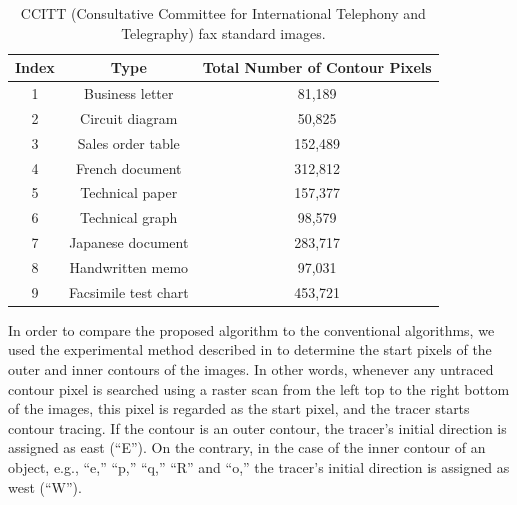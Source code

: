 \documentclass[sensors,article,accept,moreauthors,pdftex,10pt,a4paper]{mdpi}
\begin{document}
\begin{table}[H]
	\centering
	\begin{tabular}{ccc}
		\toprule
		\textbf{Index} & \textbf{Type} & \textbf{Total Number of Contour Pixels} \\
		\midrule
		1 & Business letter & 81,189 \\
		2 & Circuit diagram & 50,825 \\
		3 & Sales order table & 152,489 \\
		4 & French document & 312,812 \\
		5 & Technical paper & 157,377 \\
		6 & Technical graph & 98,579 \\
		7 & Japanese document & 283,717 \\
		8 & Handwritten memo & 97,031 \\
		9 & Facsimile test chart & 453,721 \\
		\bottomrule
	\end{tabular}
	\caption{\protect CCITT (Consultative Committee for International Telephony and Telegraphy) fax standard images.}
	\label{table:ccitt}
\end{table}	


In order to compare the proposed algorithm to the conventional algorithms, we used the experimental method described in \cite{Danielsson1981Improvement} to determine the start pixels of the outer and inner contours of the images. In other words, whenever any untraced contour pixel is searched using a raster scan from the left top to the right bottom of the images, this pixel is regarded as the start pixel, and the tracer starts contour tracing. If the contour is an outer contour, the tracer's initial direction is assigned as east (``E''). On the contrary, in the case of the inner contour of an object, e.g., ``e,'' ``p,'' ``q,'' ``R'' and ``o,'' the tracer's initial direction is assigned as west (``W''). 
\end{document}
